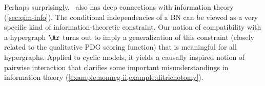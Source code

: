 Perhaps surprisingly,
\cibility\ 
also has deep connections with information theory
(\cref{sec:qim-info}).
The conditional independencies of a BN can be viewed as a very specific kind of information-theoretic constraint.
Our notion of compatibility with a hypergraph $\Ar$ 
    turns out to imply a generalization of this
    constraint (closely related to the qualitative PDG scoring function)
    that is meaningful for all hypergraphs.
Applied to cyclic models, it yields a causally inspired notion of pairwise interaction that clarifies some important misunderstandings in information theory (\cref{example:nonneg-ii,example:ditrichotomy}).
